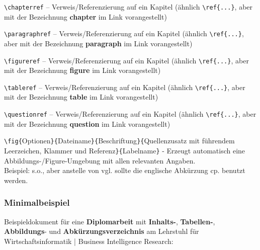 \begin{description}

  \item{\verb"\chapterref"} -- Verweis/Referenzierung auf ein Kapitel (ähnlich \verb"\ref{...}", aber mit der
      Bezeichnung \textbf{chapter} im Link vorangestellt)

  \item{\verb"\paragraphref"} -- Verweis/Referenzierung auf ein Kapitel (ähnlich \verb"\ref{...}", aber mit
      der Bezeichnung \textbf{paragraph} im Link vorangestellt)

  \item{\verb"\figureref"} -- Verweis/Referenzierung auf ein Kapitel (ähnlich \verb"\ref{...}", aber mit
      der Bezeichnung \textbf{figure} im Link vorangestellt)

  \item{\verb"\tableref"} -- Verweis/Referenzierung auf ein Kapitel (ähnlich \verb"\ref{...}", aber mit
      der Bezeichnung \textbf{table} im Link vorangestellt)

  \item{\verb"\questionref"} -- Verweis/Referenzierung auf ein Kapitel (ähnlich \verb"\ref{...}", aber mit
      der Bezeichnung \textbf{question} im Link vorangestellt)

  \item{\verb"\fig{"Optionen\verb"}{"Dateiname\verb"}{"Beschriftung\verb"}{"Quellenzusatz mit führendem
      Leerzeichen, Klammer und Referenz\verb"}{"Labelname\verb"}"} - Erzeugt automatisch eine
      Abbildungs-/Figure-Umgebung mit allen relevanten Angaben.\\Beispiel: s.o., aber anstelle von vgl. sollte die englische Abkürzung cp. benutzt werden.
 \end{description}


\subsubsection{Minimalbeispiel}
\label{chap:beispieldokument}

Beispieldokument für eine \textbf{Diplomarbeit} mit \textbf{Inhalts-},
\textbf{Tabellen-},
\textbf{Abbildungs}- und \textbf{Abkürzungsverzeichnis} am Lehrstuhl für Wirtschaftsinformatik | Business Intelligence Research:

